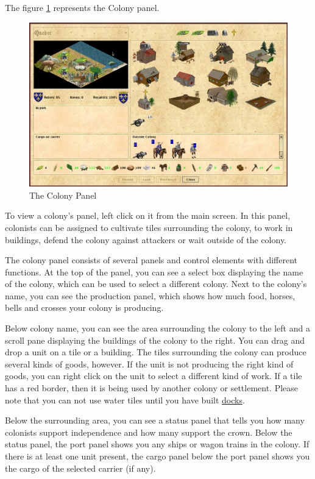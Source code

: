 \documentclass[12pt]{book}
\begin{document}
The figure \ref{colony_panel_fig} represents the Colony panel.
\begin{figure}[htb]
  \begin{center}
    \includegraphics[scale=0.35]{images/colony_panel.png}
    \caption{The Colony Panel\label{colony_panel_fig}}
  \end{center}
\end{figure}

To view a colony's panel, left click on it from the main screen. In
this panel, colonists can be assigned to cultivate tiles surrounding
the colony, to work in buildings, defend the colony against attackers
or wait outside of the colony.

The colony panel consists of several panels and control elements with
different functions. At the top of the panel, you can see a select box
displaying the name of the colony, which can be used to select a
different colony. Next to the colony's name, you can see the
production panel, which shows how much food, horses, bells and crosses
your colony is producing.

Below colony name, you can see the area surrounding the colony to
the left and a scroll pane displaying the buildings of the colony to
the right. You can drag and drop a unit on a tile or a building. The
tiles surrounding the colony can produce several kinds of goods,
however. If the unit is not producing the right kind of goods, you can
right click on the unit to select a different kind of work. If a tile
has a red border, then it is being used by another colony or
settlement. Please note that you can not use water tiles until you
have built \hyperlink{Dock}{docks}.

Below the surrounding area, you can see a status panel that tells you
how many colonists support independence and how many support the
crown. Below the status panel, the port panel shows you any ships or
wagon trains in the colony. If there is at least one unit present, the
cargo panel below the port panel shows you the cargo of the selected
carrier (if any).
\end{document}
